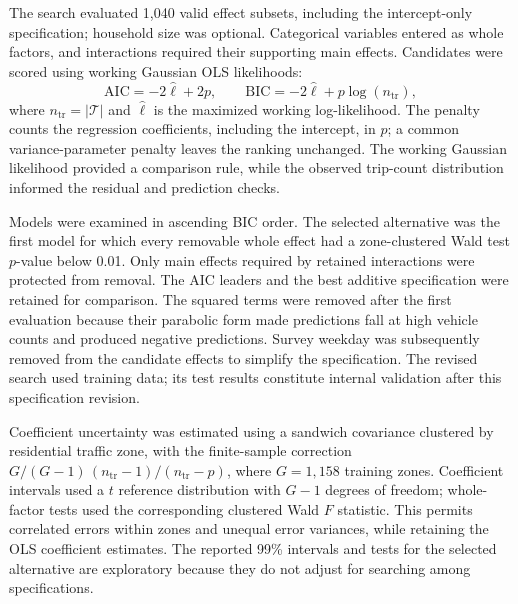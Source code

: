 The search evaluated 1,040 valid effect subsets, including the intercept-only specification; household size was optional. Categorical variables entered as whole factors, and interactions required their supporting main effects. Candidates were scored using working Gaussian OLS likelihoods:
\begin{equation}
 \mathrm{AIC}=-2\widehat\ell+2p,
 \qquad
 \mathrm{BIC}=-2\widehat\ell+p\log(n_{\mathrm{tr}}),
 \label{eq:ic}
\end{equation}
where $n_{\mathrm{tr}}=|\mathcal T|$ and $\widehat\ell$ is the maximized working log-likelihood. The penalty counts the regression coefficients, including the intercept, in $p$; a common variance-parameter penalty leaves the ranking unchanged. The working Gaussian likelihood provided a comparison rule, while the observed trip-count distribution informed the residual and prediction checks.

Models were examined in ascending BIC order. The selected alternative was the first model for which every removable whole effect had a zone-clustered Wald test $p$-value below 0.01. Only main effects required by retained interactions were protected from removal. The AIC leaders and the best additive specification were retained for comparison. The squared terms were removed after the first evaluation because their parabolic form made predictions fall at high vehicle counts and produced negative predictions. Survey weekday was subsequently removed from the candidate effects to simplify the specification. The revised search used training data; its test results constitute internal validation after this specification revision.

Coefficient uncertainty was estimated using a sandwich covariance clustered by residential traffic zone, with the finite-sample correction
$G/(G-1)\,(n_{\mathrm{tr}}-1)/(n_{\mathrm{tr}}-p)$, where $G=1,158$ training zones. Coefficient intervals used a $t$ reference distribution with $G-1$ degrees of freedom; whole-factor tests used the corresponding clustered Wald $F$ statistic. This permits correlated errors within zones and unequal error variances, while retaining the OLS coefficient estimates. The reported 99\% intervals and tests for the selected alternative are exploratory because they do not adjust for searching among specifications.

